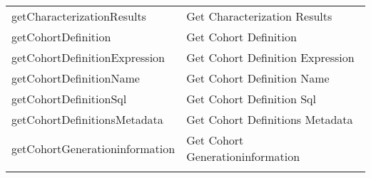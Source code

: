 \documentclass[
]{article}
\begin{document}
\begin{longtable}[]{@{}ll@{}}
\begin{minipage}[t]{0.46\columnwidth}
getCharacterizationResults\strut
\end{minipage} & \begin{minipage}[t]{0.48\columnwidth}\raggedright
Get Characterization Results\strut
\end{minipage}\tabularnewline
\begin{minipage}[t]{0.46\columnwidth}\raggedright
getCohortDefinition\strut
\end{minipage} & \begin{minipage}[t]{0.48\columnwidth}\raggedright
Get Cohort Definition\strut
\end{minipage}\tabularnewline
\begin{minipage}[t]{0.46\columnwidth}\raggedright
getCohortDefinitionExpression\strut
\end{minipage} & \begin{minipage}[t]{0.48\columnwidth}\raggedright
Get Cohort Definition Expression\strut
\end{minipage}\tabularnewline
\begin{minipage}[t]{0.46\columnwidth}\raggedright
getCohortDefinitionName\strut
\end{minipage} & \begin{minipage}[t]{0.48\columnwidth}\raggedright
Get Cohort Definition Name\strut
\end{minipage}\tabularnewline
\begin{minipage}[t]{0.46\columnwidth}\raggedright
getCohortDefinitionSql\strut
\end{minipage} & \begin{minipage}[t]{0.48\columnwidth}\raggedright
Get Cohort Definition Sql\strut
\end{minipage}\tabularnewline
\begin{minipage}[t]{0.46\columnwidth}\raggedright
getCohortDefinitionsMetadata\strut
\end{minipage} & \begin{minipage}[t]{0.48\columnwidth}\raggedright
Get Cohort Definitions Metadata\strut
\end{minipage}\tabularnewline
\begin{minipage}[t]{0.46\columnwidth}\raggedright
getCohortGenerationinformation\strut
\end{minipage} & \begin{minipage}[t]{0.48\columnwidth}\raggedright
Get Cohort Generationinformation\strut
\end{minipage}\tabularnewline
\begin{minipage}[t]{0.46\columnwidth}\raggedright

\end{minipage}
\end{longtable}
\end{document}
